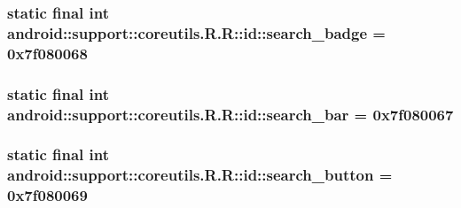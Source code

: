 \hypertarget{classandroid_1_1support_1_1coreutils_1_1_r_1_1id_2fcff168bd1f9840598f119058ae56a4}{
\subsubsection[{search\_\-badge}]{\setlength{\rightskip}{0pt plus 5cm}static final int android::support::coreutils.R.R::id::search\_\-badge = 0x7f080068}}
\label{classandroid_1_1support_1_1coreutils_1_1_r_1_1id_2fcff168bd1f9840598f119058ae56a4}


\hypertarget{classandroid_1_1support_1_1coreutils_1_1_r_1_1id_15eed73af7ce462786449b1312b05512}{
\subsubsection[{search\_\-bar}]{\setlength{\rightskip}{0pt plus 5cm}static final int android::support::coreutils.R.R::id::search\_\-bar = 0x7f080067}}
\label{classandroid_1_1support_1_1coreutils_1_1_r_1_1id_15eed73af7ce462786449b1312b05512}


\hypertarget{classandroid_1_1support_1_1coreutils_1_1_r_1_1id_50ac5a691e1eb79a2b4001e0ae446f63}{
\subsubsection[{search\_\-button}]{\setlength{\rightskip}{0pt plus 5cm}static final int android::support::coreutils.R.R::id::search\_\-button = 0x7f080069}}
\label{classandroid_1_1support_1_1coreutils_1_1_r_1_1id_50ac5a691e1eb79a2b4001e0ae446f63}


